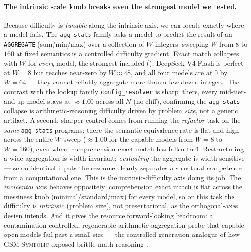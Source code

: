 \paragraph{The intrinsic scale knob breaks even the strongest model we tested.}
Because difficulty is \emph{tunable} along the intrinsic axis, we can locate exactly where a
model fails. The \texttt{agg\_stats} family asks a model to predict the result of an
\texttt{AGGREGATE} (sum/min/max) over a collection of $W$ integers; sweeping $W$ from $8$ to
$160$ at fixed semantics is a controlled difficulty gradient. Exact match collapses with $W$
for \emph{every} model, the strongest included (): DeepSeek-V4-Flash is perfect
at $W{=}8$ but reaches near-zero by $W{\approx}48$, and all four models are at $0$ by
$W{=}64$ --- they cannot reliably aggregate more than a few dozen integers. The contrast with
the lookup family \texttt{config\_resolver} is sharp: there, every mid-tier-and-up model
stays at $\approx 1.00$ across all $N$ (no cliff), confirming the \texttt{agg\_stats} collapse
is arithmetic-reasoning difficulty driven by problem \emph{size}, not a generic artifact. A
second, sharper control comes from running the \emph{refactor} task on the \emph{same}
\texttt{agg\_stats} programs: there the semantic-equivalence rate is flat and high across
the entire $W$ sweep ($\approx 1.00$ for the capable models from $W{=}8$ to $W{=}160$),
even where comprehension exact match has fallen to $0$. Restructuring a wide aggregation is
width-invariant; \emph{evaluating} the aggregate is width-sensitive --- so on identical
inputs the resource cleanly separates a structural competence from a computational one. This
is the intrinsic-difficulty axis doing its job. The \emph{incidental} axis behaves oppositely:
comprehension exact match is flat across the messiness knob (minimal/standard/max) for every
model, so on this task the difficulty is \emph{intrinsic} (problem size), not
presentational, as the orthogonal-axes design intends. And it gives the resource
forward-looking headroom: a contamination-controlled, regenerable arithmetic-aggregation probe
that capable open models fail past a small size --- the controlled-generation analogue of
how \textsc{GSM-Symbolic} exposed brittle math reasoning~\citep{mirzadeh2024gsm}.

